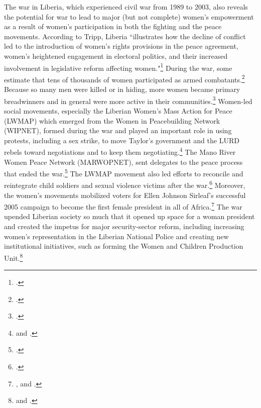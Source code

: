 \documentclass [12pt] {article}
\begin{document}
The war in Liberia, which experienced civil war from 1989 to 2003, also reveals the potential for war to lead to major (but not complete) women's empowerment as a result of women's participation in both the fighting and the peace movements. According to Tripp, Liberia ``illustrates how the decline of conflict led to the introduction of women's rights provisions in the peace agreement, women's heightened engagement in electoral politics, and their increased involvement in legislative reform affecting women."\footnote{.} During the war, some estimate that tens of thousands of women participated as armed combatants.\footnote{.} Because so many men were killed or in hiding, more women became primary breadwinners and in general were more active in their communities.\footnote{.} Women-led social movements, especially the Liberian Women's Mass Action for Peace (LWMAP) which emerged from the Women in Peacebuilding Network (WIPNET), formed during the war and played an important role in using protests, including a sex strike, to move Taylor's government and the LURD rebels toward negotiations and to keep them negotiating.\footnote{ and .} The Mano River Women Peace Network (MARWOPNET), sent delegates to the peace process that ended the war.\footnote{.} The LWMAP movement also led efforts to reconcile and reintegrate child soldiers and sexual violence victims after the war.\footnote{.} Moreover, the women's movements mobilized voters for Ellen Johnson Sirleaf's successful 2005 campaign to become the first female president in all of Africa.\footnote{,  and .} The war upended Liberian society so much that it opened up space for a woman president and created the impetus for major security-sector reform, including increasing women's representation in the Liberian National Police and creating new institutional initiatives, such as forming the Women and Children Production Unit.\footnote{ and .} \\
\end{document}
